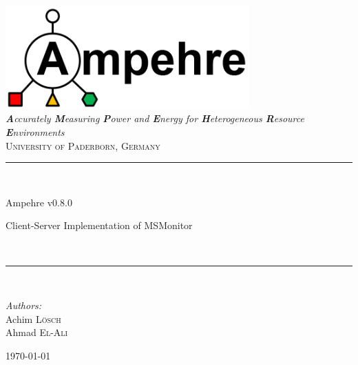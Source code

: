 %
%
%
%
%
%

\begin{titlepage}

\begin{center}

\includegraphics[width=0.7\textwidth]{figures/ampehre_logo.png}\\[1cm]

\textit{\LARGE \textbf{A}ccurately \textbf{M}easuring \textbf{P}ower and \textbf{E}nergy for \textbf{H}eterogeneous \textbf{R}esource \textbf{E}nvironments}\\[1cm]

\textsc{\Large University of Paderborn, Germany}\\[1cm]

\newcommand{\HRule}{\rule{\linewidth}{0.5mm}} \HRule \\[0.6cm] { 
	\begin{center}
		\huge Ampehre v0.8.0
	\end{center} 
	Client-Server Implementation of MSMonitor}\\[0.4cm]

\HRule\\[1cm]

\begin{minipage}{0.4\textwidth} \begin{center} \large \emph{Authors:}\\ Achim \textsc{L\"osch}\\Ahmad \textsc{El-Ali} \end{center} \end{minipage}

\vfill

{\Large \today}

\end{center}

\end{titlepage}

\tableofcontents
